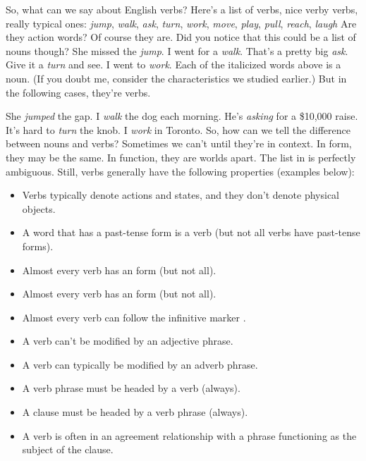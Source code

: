 So, what can we say about English verbs? Here's a list of verbs, nice verby verbs, really typical ones: 
\ea 
    \emph{jump}, \emph{walk}, \emph{ask}, \emph{turn}, \emph{work}, \emph{move}, \emph{play}, \emph{pull}, \emph{reach}, \emph{laugh} \label{ex:verblist}
\z
{}Are they action words? Of course they are. Did you notice that this could be a list of nouns though?
\ea\label{ex:verb-list-as-nouns}
    \ea She missed the \emph{jump}.
    \ex I went for a \emph{walk}.
    \ex That's a pretty big \emph{ask}.
    \ex Give it a \emph{turn} and see.
    \ex I went to \emph{work}.
\z
\z
Each of the italicized words above is a noun. (If you doubt me, consider the characteristics we studied earlier.) But in the following cases, they're verbs.

\ea\label{ex:verb-list-as-verbs}
    \ea She \emph{jumped} the gap.
    \ex I \emph{walk} the dog each morning.
    \ex He's \emph{asking} for a \$10,000 raise.
    \ex It's hard to \emph{turn} the knob.
    \ex I \emph{work} in Toronto.
\z
\z
So, how can we tell the difference between nouns and verbs? Sometimes we can't until they're in context. In form, they may be the same. In function, they are worlds apart. The list in  is perfectly ambiguous. Still, verbs generally have the following properties (examples below):

\begin{itemize}[noitemsep]
    \item {}Verbs typically denote actions and states, and they don't denote physical objects.
    \item {}A word that has a past-tense form is a verb (but not all verbs have past-tense forms).
    \item Almost every verb has an  form (but not all).
    \item Almost every verb has an  form (but not all).
    \item Almost every verb can follow the infinitive marker .
    \item A verb can't be modified by an adjective phrase.
    \item {}A verb can typically be modified by an adverb phrase.
    \item A verb phrase must be headed by a verb (always).
    \item {}A clause must be headed by a verb phrase (always).
    \item {}A verb is often in an agreement relationship with a phrase functioning as the subject of the clause.
\end{itemize}

